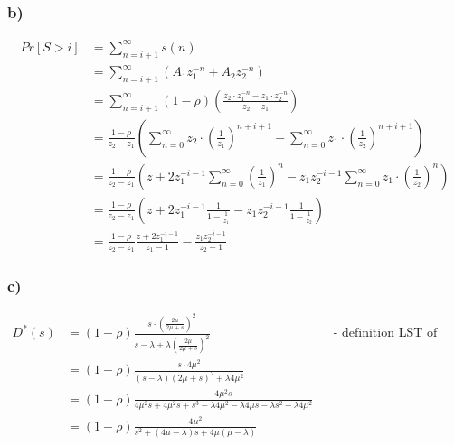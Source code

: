 \subsubsection*{ b) }
\begin{align*}
Pr\left[S> i\right]&=\sum _{{n=i+1}}^{\infty }s\left(n\right)\\
&=\sum _{{n=i+1}}^{\infty }\left(A_{1}z_{1}^{{-n}}+A_{2}z_{2}^{{-n}}\right)\\
&=\sum _{{n=i+1}}^{\infty }\left(1-\rho \right)\left(\frac{z_{2}\cdot z_{1}^{{-n}}-z_{1}\cdot z_{2}^{{-n}}}{z_{2}-z_{1}}\right)\\
&=\frac{1-\rho }{z_{2}-z_{1}}\left(\sum _{{n=0}}^{\infty }z_{2}\cdot \left(\frac{1}{z_{1}}\right)^{{n+i+1}}-\sum _{{n=0}}^{\infty }z_{1}\cdot \left(\frac{1}{z_{2}}\right)^{{n+i+1}}\right)\\
&=\frac{1-\rho }{z_{2}-z_{1}}\left(z+2z_{1}^{{-i-1}}\sum _{{n=0}}^{\infty }\left(\frac{1}{z_{1}}\right)^{n}-z_{1}z_{2}^{{-i-1}}\sum _{{n=0}}^{\infty }z_{1}\cdot \left(\frac{1}{z_{2}}\right)^{{n}}\right)\\
&=\frac{1-\rho }{z_{2}-z_{1}}\left(z+2z_{1}^{{-i-1}}\frac{1}{1-\frac{1}{z_{1}}}-z_{1}z_{2}^{{-i-1}}\frac{1}{1-\frac{1}{z_{2}}}\right)\\
&=\frac{1-\rho }{z_{2}-z_{1}}\frac{z+2z_{1}^{{-i-1}}}{z_{1}-1}-\frac{z_{1}z_{2}^{{-i-1}}}{z_{2}-1}
\end{align*}

\subsubsection*{ c) }
\begin{align*}
D^{{\ast }}\left(s\right)&=\left(1-\rho \right)\frac{s\cdot \left(\frac{2\mu }{2\mu +s}\right)^{2}}{s-\lambda +\lambda \left(\frac{2\mu }{2\mu +s}\right)^{2}} && \text{- definition LST of sojourn time -}\\
&=\left(1-\rho \right)\frac{s\cdot 4\mu ^{2}}{\left(s-\lambda \right)\left(2\mu +s\right)^{2}+\lambda 4\mu ^{2}}\\
&=\left(1-\rho \right)\frac{4\mu ^{2}s}{4\mu ^{2}s+4\mu ^{2}s+s^{3}-\lambda 4\mu ^{2}-\lambda 4\mu s-\lambda s^{2}+\lambda 4\mu ^{2}}\\
&=\left(1-\rho \right)\frac{4\mu ^{2}}{s^{2}+\left(4\mu -\lambda \right)s+4\mu \left(\mu -\lambda \right)}
\end{align*}


